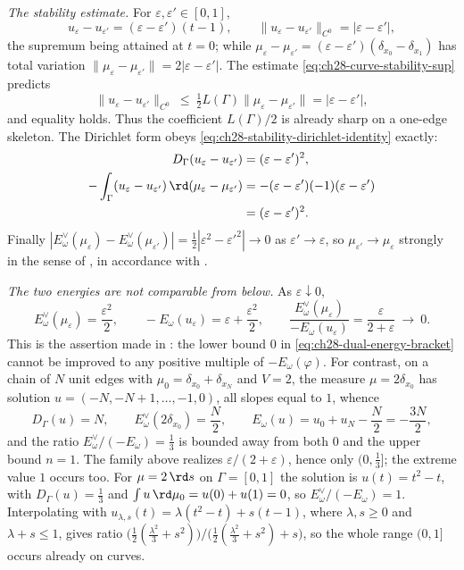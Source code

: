 \begin{example}
\emph{The stability estimate.}  For
$\varepsilon,\varepsilon'\in[0,1]$,
\[
 u_\varepsilon-u_{\varepsilon'}
 =(\varepsilon-\varepsilon')(t-1),
 \qquad
 \lVert u_\varepsilon-u_{\varepsilon'}\rVert_{C^0}
 =|\varepsilon-\varepsilon'| ,
\]
the supremum being attained at $t=0$; while
$\mu_\varepsilon-\mu_{\varepsilon'}
=(\varepsilon-\varepsilon')(\delta_{x_0}-\delta_{x_1})$ has total variation
$\lVert\mu_\varepsilon-\mu_{\varepsilon'}\rVert
=2|\varepsilon-\varepsilon'|$.  The estimate
\eqref{eq:ch28-curve-stability-sup} predicts
\[
 \lVert u_\varepsilon-u_{\varepsilon'}\rVert_{C^0}
 \ \leq\ \tfrac12L(\Gamma)
       \lVert\mu_\varepsilon-\mu_{\varepsilon'}\rVert
 =|\varepsilon-\varepsilon'| ,
\]
and equality holds.  Thus the coefficient $L(\Gamma)/2$ is already sharp
on a one-edge skeleton.  The Dirichlet form obeys
\eqref{eq:ch28-stability-dirichlet-identity} exactly:
\[
 \begin{aligned}
 D_\Gamma(u_\varepsilon-u_{\varepsilon'})
 &=(\varepsilon-\varepsilon')^2,\\
 -\int_\Gamma(u_\varepsilon-u_{\varepsilon'})\,
  \rd(\mu_\varepsilon-\mu_{\varepsilon'})
    &=-(\varepsilon-\varepsilon')(-1)(\varepsilon-\varepsilon')\\
 &=(\varepsilon-\varepsilon')^2 .
 \end{aligned}
\]
Finally
$|E^\vee_\omega(\mu_\varepsilon)-E^\vee_\omega(\mu_{\varepsilon'})|
=\tfrac12|\varepsilon^2-\varepsilon'^2|\to0$ as
$\varepsilon'\to\varepsilon$, so $\mu_{\varepsilon'}\to\mu_\varepsilon$
strongly in the sense of , in
accordance with .

\emph{The two energies are not comparable from below.}  As
$\varepsilon\downarrow0$,
\[
 E^\vee_\omega(\mu_\varepsilon)=\frac{\varepsilon^2}2,
 \qquad
 -E_\omega(u_\varepsilon)=\varepsilon+\frac{\varepsilon^2}2,
 \qquad
 \frac{E^\vee_\omega(\mu_\varepsilon)}{-E_\omega(u_\varepsilon)}
 =\frac{\varepsilon}{2+\varepsilon}\ \longrightarrow\ 0 .
\]
This is the assertion made in : the lower
bound $0$ in \eqref{eq:ch28-dual-energy-bracket} cannot be improved to any
positive multiple of $-E_\omega(\varphi)$.  For contrast, on a chain of
$N$ unit edges with $\mu_0=\delta_{x_0}+\delta_{x_N}$ and $V=2$, the
measure $\mu=2\delta_{x_0}$ has solution
$u=(-N,-N+1,\ldots,-1,0)$, all slopes equal to $1$, whence
\[
 D_\Gamma(u)=N,
 \qquad
 E^\vee_\omega(2\delta_{x_0})=\frac N2 ,
 \qquad
 E_\omega(u)=u_0+u_N-\frac N2=-\frac{3N}2 ,
\]
and the ratio $E^\vee_\omega/(-E_\omega)=\tfrac13$ is bounded away from
both $0$ and the upper bound $n=1$.  The family above realizes
$\varepsilon/(2+\varepsilon)$, hence only $(0,\tfrac13]$; the extreme
value $1$ occurs too.  For $\mu=2\,\rd s$ on $\Gamma=[0,1]$ the
solution is $u(t)=t^2-t$, with $D_\Gamma(u)=\tfrac13$ and
$\int u\,\rd\mu_0=u(0)+u(1)=0$, so
$E^\vee_\omega/(-E_\omega)=1$.  Interpolating with
$u_{\lambda,s}(t)=\lambda(t^2-t)+s(t-1)$, where $\lambda,s\geq0$ and
$\lambda+s\leq1$, gives ratio
$\bigl(\tfrac12(\tfrac{\lambda^2}3+s^2)\bigr)
 /\bigl(\tfrac12(\tfrac{\lambda^2}3+s^2)+s\bigr)$,
so the whole range $(0,1]$ occurs already on curves.
\end{example}

